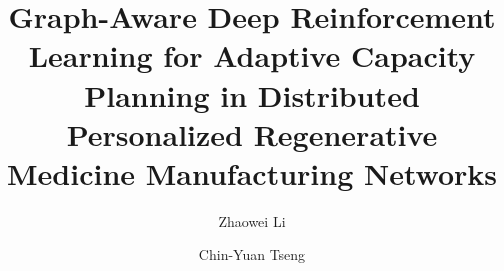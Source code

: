 \documentclass[preprint,review,12pt,nonatbib]{elsarticle}
\providecommand{\DIFadd}[1]{{\protect\color{blue}#1}} %
\providecommand{\DIFaddbegin}{} %
\providecommand{\DIFaddend}{} %
\providecommand{\DIFaddincludegraphics}[2][]{{\color{blue}\fbox{\DIFOincludegraphics[#1]{#2}}}} %
\DeclareRobustCommand{\DIFaddbegin}{\DIFOaddbegin \let\includegraphics\DIFaddincludegraphics} %
\DeclareRobustCommand{\DIFaddend}{\DIFOaddend \let\includegraphics\DIFOincludegraphics} %
\begin{document}
\begin{frontmatter}

\title{Graph-Aware Deep Reinforcement Learning for Adaptive Capacity Planning in Distributed Personalized Regenerative Medicine Manufacturing Networks}

\author[inst1]{Zhaowei Li}
\DIFaddbegin \author[inst1]{\DIFadd{Chin-Yuan Tseng}}
\DIFaddend {}

\begin{abstract}


\end{abstract}
\end{frontmatter}
\end{document}
